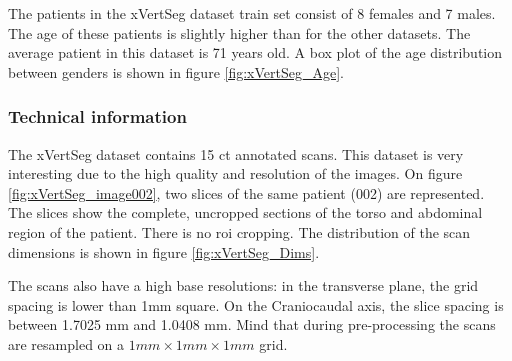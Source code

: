 The patients in the xVertSeg dataset train set consist of 8 females and 7 males.
The age of these patients is slightly higher than for the other datasets.
The average patient in this dataset is 71 years old.
A box plot of the age distribution between genders is shown in figure \ref{fig:xVertSeg_Age}. 

\begin{SCtable}[\sidecaptionrelwidth][h]
    \centering
        
        \caption{Every patient in the xVertSeg dataset suffers from at least one spine pathology.
        Most of these pathologies are identified as \textit{mild}.
        This table counts the spine pathologies and normal vertebrae observed over all 15 patients in the xVertSeg dataset.}   
\end{SCtable}

\subsubsection{Technical information}

The xVertSeg dataset contains 15 \acrshort{ct} annotated scans. 
This dataset is very interesting due to the high quality and resolution of the images.
On figure \ref{fig:xVertSeg_image002}, two slices of the same patient (002) are represented.
The slices show the complete, uncropped sections of the torso and abdominal region of the patient. 
There is no \acrshort{roi} cropping.
The distribution of the scan dimensions is shown in figure \ref{fig:xVertSeg_Dims}.

\begin{SCfigure}[][htb]
    \centering
    \begin{minipage}{.5\textwidth}
        
    \end{minipage}%
    \begin{minipage}{0.5\textwidth}
        
    \end{minipage}
    \caption{Scan \textit{image002} of the xVertSeg dataset. Sagittal slice on the left and Transverse slice on the right.\label{fig:xVertSeg_image002}}
\end{SCfigure}

The scans also have a high base resolutions: in the transverse plane, the grid spacing is lower than 1mm square. 
On the Craniocaudal axis, the slice spacing is between 1.7025 mm and 1.0408 mm.
Mind that during pre-processing the scans are resampled on a $1mm \times 1mm \times 1mm$ grid.


\begin{SCfigure}[][htb]
    \centering
    
    \caption{Distribution of the dimensions of the xVertSeg images. \label{fig:xVertSeg_Dims}}
\end{SCfigure}



